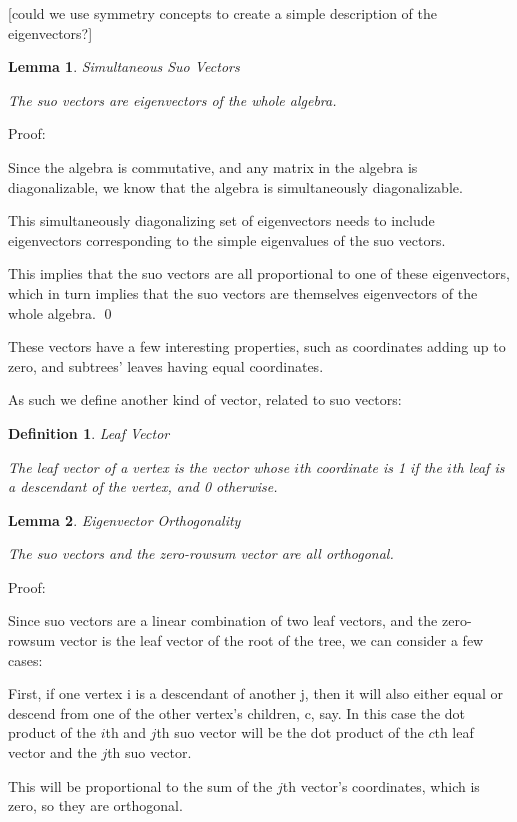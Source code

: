 \documentclass[10pt,a4paper]{report}
\newtheorem{definition}{Definition}
\newtheorem{lemma}{Lemma}
\begin{document}
[could we use symmetry concepts to create a simple description of the eigenvectors?]

\begin{lemma} Simultaneous Suo Vectors

	The suo vectors are eigenvectors of the whole algebra.
\end{lemma}
Proof:

Since the algebra is commutative, and any matrix in the algebra is
diagonalizable, we know that the algebra is simultaneously diagonalizable.

This simultaneously diagonalizing set of eigenvectors needs to include
eigenvectors corresponding to the simple eigenvalues of the suo vectors.

This implies that the suo vectors are all proportional to one of these
eigenvectors, which in turn implies that the suo vectors are themselves
eigenvectors of the whole algebra. \qed

These vectors have a few interesting properties, such as coordinates adding up
to zero, and subtrees' leaves having equal coordinates.

As such we define another kind of vector, related to suo vectors:

\begin{definition} Leaf Vector

	The leaf vector of a vertex is the vector whose $i$th coordinate is 1 if the
	$i$th leaf is a descendant of the vertex, and 0 otherwise.
\end{definition}

\begin{lemma} Eigenvector Orthogonality

	The suo vectors and the zero-rowsum vector are all orthogonal.
\end{lemma}

Proof:

Since suo vectors are a linear combination of two leaf vectors, and the
zero-rowsum vector is the leaf vector of the root of the tree, we can consider
a few cases:

First, if one vertex i is a descendant of another j, then it will also either
equal or descend from one of the other vertex's children, c, say.  In this case
the dot product of the $i$th and $j$th suo vector will be the dot product of
the $c$th leaf vector and the $j$th suo vector.

This will be proportional to the sum of the $j$th vector's coordinates, which
is zero, so they are orthogonal.
\end{document}
